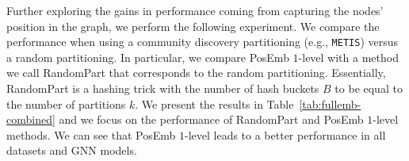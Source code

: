 \documentclass[conference]{IEEEtran}
\begin{document}

Further exploring the gains in performance coming from capturing the nodes' position in the graph, we perform the following experiment. We compare the performance when using a community discovery partitioning (e.g., \texttt{METIS}) versus a random partitioning. In particular, we compare PosEmb $1$-level with a method we call RandomPart that corresponds to the random partitioning. Essentially, RandomPart is a hashing trick with the number of hash buckets $B$ to be equal to the number of partitions $k$.
We present the results in Table~\ref{tab:fullemb-combined} and we focus on the performance of RandomPart and PosEmb $1$-level methods. We can see that PosEmb $1$-level leads to a better performance in all datasets and GNN models. 
\end{document}
